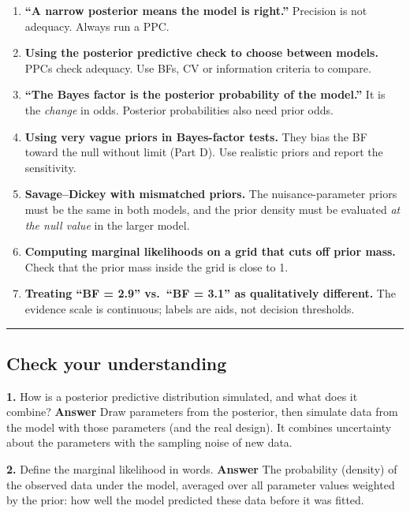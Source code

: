 \begin{enumerate}
\def\labelenumi{\arabic{enumi}.}
\tightlist
\item
  \textbf{``A narrow posterior means the model is right.''} Precision is
  not adequacy. Always run a PPC.
\item
  \textbf{Using the posterior predictive check to choose between
  models.} PPCs check adequacy. Use BFs, CV or information criteria to
  compare.
\item
  \textbf{``The Bayes factor is the posterior probability of the
  model.''} It is the \emph{change} in odds. Posterior probabilities
  also need prior odds.
\item
  \textbf{Using very vague priors in Bayes-factor tests.} They bias the
  BF toward the null without limit (Part D). Use realistic priors and
  report the sensitivity.
\item
  \textbf{Savage--Dickey with mismatched priors.} The nuisance-parameter
  priors must be the same in both models, and the prior density must be
  evaluated \emph{at the null value} in the larger model.
\item
  \textbf{Computing marginal likelihoods on a grid that cuts off prior
  mass.} Check that the prior mass inside the grid is close to 1.
\item
  \textbf{Treating ``BF = 2.9'' vs.~``BF = 3.1'' as qualitatively
  different.} The evidence scale is continuous; labels are aids, not
  decision thresholds.
\end{enumerate}

\begin{center}\rule{0.5\linewidth}{0.5pt}\end{center}

\subsection{Check your understanding}

\textbf{1.} How is a posterior predictive distribution simulated, and
what does it combine? \textbf{Answer} Draw parameters from the
posterior, then simulate data from the model with those parameters (and
the real design). It combines uncertainty about the parameters with the
sampling noise of new data.

\textbf{2.} Define the marginal likelihood in words. \textbf{Answer} The
probability (density) of the observed data under the model, averaged
over all parameter values weighted by the prior: how well the model
predicted these data before it was fitted.

